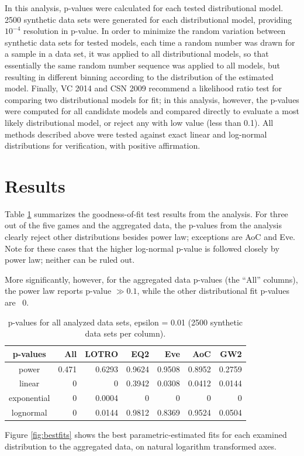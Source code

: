 \documentclass[pdftex,12pt]{llncs}
\begin{document}
In this analysis, p-values were calculated for each tested distributional model.
2500 synthetic data sets were generated for each distributional model, providing $10^{-4}$ resolution in p-value.
In order to minimize the random variation between synthetic data sets for tested models, each time a random number was drawn for a sample in a data set, it was applied to all distributional models, so that essentially the same random number sequence was applied to all models, but resulting in different binning according to the distribution of the estimated model.
Finally, VC 2014 and CSN 2009 recommend a likelihood ratio test for comparing two distributional models for fit; in this analysis, however, the p-values were computed for all candidate models and compared directly to evaluate a most likely distributional model, or reject any with low value (less than 0.1).
All methods described above were tested against exact linear and log-normal distributions for verification, with positive affirmation.

\section{Results}
Table \ref{tab:pvalues} summarizes the goodness-of-fit test results from the analysis.
For three out of the five games and the aggregated data, the p-values from the analysis clearly reject other distributions besides power law; exceptions are AoC and Eve.
Note for these cases that the higher log-normal p-value is followed closely by power law; neither can be ruled out.

More significantly, however, for the aggregated data p-values (the “All” columns), the power law reports p-value $\gg 0.1$, while the other distributional fit p-values are ~0.  

\begin{table}
	\centering
	\caption{p-values for all analyzed data sets, epsilon = 0.01 (2500 synthetic data sets per column).}
	\begin{tabular}{|c r r r r r r|}
		\hline
		p-values & 	All	& LOTRO & EQ2 & Eve & AoC & GW2 \\
		\hline
		power & 0.471 & 0.6293 & 0.9624 & 0.9508 & 0.8952 & 0.2759 \\
		linear & 0 & 0 & 0.3942 & 0.0308 & 0.0412 & 0.0144 \\
		exponential & 0 & 0.0004 & 0 & 0 & 0 & 0 \\
		lognormal & 0 & 0.0144 & 0.9812 & 0.8369 & 0.9524 & 0.0504 \\
		\hline
	\end{tabular}	
	\label{tab:pvalues}
\end{table}
Figure \ref{fig:bestfits} shows the best parametric-estimated fits for each examined distribution to the aggregated data, on natural logarithm transformed axes.
\end{document}
